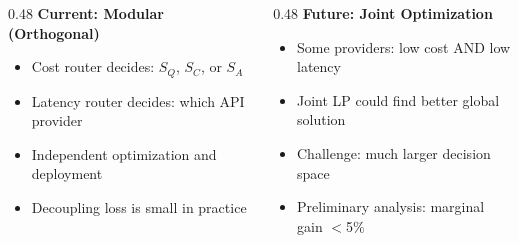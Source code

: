 \documentclass[aspectratio=169,10pt]{beamer}
\begin{document}
\begin{frame}[noframenumbering]
\vspace{0.3cm}
\begin{columns}[T]
\begin{column}{0.48\textwidth}
\textbf{Current: Modular (Orthogonal)}
\begin{itemize}\setlength{\itemsep}{2pt}
    \item Cost router decides: $S_Q$, $S_C$, or $S_A$
    \item Latency router decides: which API provider
    \item Independent optimization and deployment
    \item Decoupling loss is small in practice
\end{itemize}
\end{column}
\begin{column}{0.48\textwidth}
\textbf{Future: Joint Optimization}
\begin{itemize}\setlength{\itemsep}{2pt}
    \item Some providers: low cost AND low latency
    \item Joint LP could find better global solution
    \item Challenge: much larger decision space
    \item Preliminary analysis: marginal gain $<$5\%
\end{itemize}
\end{column}
\end{columns}
\end{frame}
\end{document}
